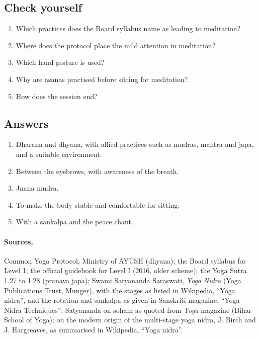\subsection*{Check yourself}
\begin{enumerate}
\item Which practices does the Board syllabus name as leading to meditation?
\item Where does the protocol place the mild attention in meditation?
\item Which hand gesture is used?
\item Why are asanas practised before sitting for meditation?
\item How does the session end?
\end{enumerate}

\subsection*{Answers}
\begin{enumerate}
\item Dharana and dhyana, with allied practices such as mudras, mantra and japa, and a suitable environment.
\item Between the eyebrows, with awareness of the breath.
\item Jnana mudra.
\item To make the body stable and comfortable for sitting.
\item With a sankalpa and the peace chant.
\end{enumerate}

\paragraph{Sources.} Common Yoga Protocol, Ministry of AYUSH (dhyana); the Board syllabus for Level 1; the official guidebook for Level I (2016, older scheme); the Yoga Sutra 1.27 to 1.28 (pranava japa); Swami Satyananda Saraswati, \emph{Yoga Nidra} (Yoga Publications Trust, Munger), with the stages as listed in Wikipedia, ``Yoga nidra'', and the rotation and sankalpa as given in Sanskriti magazine, ``Yoga Nidra Techniques''; Satyananda on soham as quoted from \emph{Yoga} magazine (Bihar School of Yoga); on the modern origin of the multi-stage yoga nidra, J. Birch and J. Hargreaves, as summarised in Wikipedia, ``Yoga nidra''.
